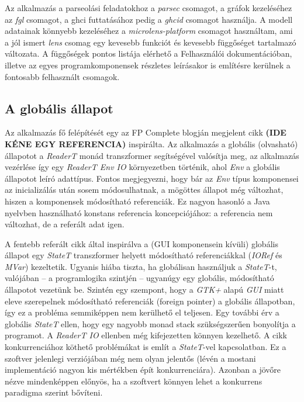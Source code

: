 Az alkalmazás a parseolási feladatokhoz a \textit{parsec} csomagot, a gráfok kezeléséhez az \textit{fgl} csomagot, a ghci futtatásához pedig a \textit{ghcid} csomagot használja. A modell adatainak könnyebb kezeléséhez a \textit{microlens-platform} csomagot használtam, ami a jól ismert \textit{lens} csomag egy kevesebb funkciót és kevesebb függőséget tartalmazó változata. A függőségek pontos listája elérhető a Felhasználói dokumentációban, illetve az egyes programkomponensek részletes leírásakor is említésre kerülnek a fontosabb felhasznált csomagok.

\subsection{A globális állapot}

Az alkalmazás fő felépítését egy az FP Complete blogján megjelent cikk \textbf{(IDE KÉNE EGY REFERENCIA)} inspirálta. 
Az alkalmazás a globális (olvasható) állapotot a \textit{ReaderT} monád transzformer segítségével valósítja meg, az alkalmazás vezérlése így egy \textit{ReaderT Env IO} környezetben történik, ahol \textit{Env} a globális állapotot leíró adattípus. Fontos megjegyezni, hogy bár az \textit{Env} típus komponensei az inicializálás után sosem módosulhatnak, a mögöttes állapot még változhat, hiszen a komponensek módosítható referenciák. Ez nagyon hasonló a Java nyelvben használható konstans referencia koncepciójához: a referencia nem változhat, de a referált adat igen.

A fentebb referált cikk által inspirálva a (GUI komponensein kívüli) globális állapot egy \textit{StateT} transzformer helyett módosítható referenciákkal (\textit{IORef} és \textit{MVar}) kezeltetik. Ugyanis hiába tiszta, ha globálisan használjuk a \textit{StateT}-t, valójában -- a programlogika szintjén -- ugyanúgy egy globális, módosítható állapotot vezetünk be. Szintén egy szempont, hogy a \textit{GTK+} alapú \textit{GUI} miatt eleve szerepelnek módosítható referenciák (foreign pointer) a globális állapotban, így ez a probléma semmiképpen nem kerülhető el teljesen. Egy további érv a globális \textit{StateT} ellen, hogy egy nagyobb monad stack szükségszerűen bonyolítja a programot. A \textit{ReaderT IO} ellenben még kifejezetten könnyen kezelhető. A cikk konkurrenciához köthető problémákat is említ a \textit{StateT}-vel kapcsolatban. Ez a szoftver jelenlegi verziójában még nem olyan jelentős (lévén a mostani implementáció nagyon kis mértékben épít konkurrenciára). Azonban a jövőre nézve mindenképpen előnyös, ha a szoftvert könnyen lehet a konkurrens paradigma szerint bővíteni.

